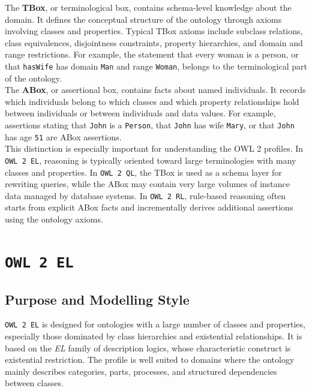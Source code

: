 \documentclass{scrbook}
\begin{document}
	The \textbf{TBox}, or terminological box, contains schema-level knowledge about the domain. It defines the conceptual structure of the ontology through axioms involving classes and properties. Typical TBox axioms include subclass relations, class equivalences, disjointness constraints, property hierarchies, and domain and range restrictions. For example, the statement that every woman is a person, or that \texttt{hasWife} has domain \texttt{Man} and range \texttt{Woman}, belongs to the terminological part of the ontology.\\
	
	The \textbf{ABox}, or assertional box, contains facts about named individuals. It records which individuals belong to which classes and which property relationships hold between individuals or between individuals and data values. For example, assertions stating that \texttt{John} is a \texttt{Person}, that \texttt{John} has wife \texttt{Mary}, or that \texttt{John} has age \texttt{51} are ABox assertions.\\
	
	This distinction is especially important for understanding the OWL 2 profiles. In \texttt{OWL 2 EL}, reasoning is typically oriented toward large terminologies with many classes and properties. In \texttt{OWL 2 QL}, the TBox is used as a schema layer for rewriting queries, while the ABox may contain very large volumes of instance data managed by database systems. In \texttt{OWL 2 RL}, rule-based reasoning often starts from explicit ABox facts and incrementally derives additional assertions using the ontology axioms.
	
	\section{\texttt{OWL 2 EL}}
	
	\subsection{Purpose and Modelling Style}
	
	\texttt{OWL 2 EL} is designed for ontologies with a large number of classes and properties, especially those dominated by class hierarchies and existential relationships. It is based on the \emph{EL} family of description logics, whose characteristic construct is existential restriction. The profile is well suited to domains where the ontology mainly describes categories, parts, processes, and structured dependencies between classes.\\
	
\end{document}
